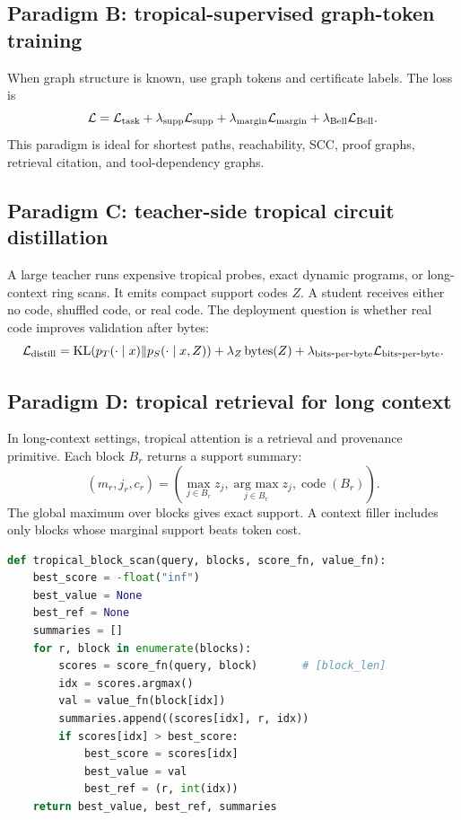 \documentclass[11pt]{article}
\newcommand{\calL}{\mathcal{L}}
\newcommand{\argmax}{\operatorname*{arg\ max}}
\newcommand{\bits}{\operatorname{bits\mbox{-}per\mbox{-}byte}}
\begin{document}
\subsection{Paradigm B: tropical-supervised graph-token training}

When graph structure is known, use graph tokens and certificate labels.  The loss is
\begin{equation}
\calL=\calL_{\rm task}+\lambda_{\rm supp}\calL_{\rm supp}+\lambda_{\rm margin}\calL_{\rm margin}+\lambda_{\rm Bell}\calL_{\rm Bell}.
\end{equation}
This paradigm is ideal for shortest paths, reachability, SCC, proof graphs, retrieval citation, and tool-dependency graphs.

\subsection{Paradigm C: teacher-side tropical circuit distillation}

A large teacher runs expensive tropical probes, exact dynamic programs, or long-context ring scans.  It emits compact support codes \(Z\).  A student receives either no code, shuffled code, or real code.  The deployment question is whether real code improves validation after bytes:
\begin{equation}
\calL_{\rm distill}=\operatorname{KL}(p_T(\cdot\mid x)\Vert p_S(\cdot\mid x,Z))+\lambda_Z\operatorname{bytes}(Z)+\lambda_{\bits}\calL_{\bits}.
\end{equation}

\subsection{Paradigm D: tropical retrieval for long context}

In long-context settings, tropical attention is a retrieval and provenance primitive.  Each block \(B_r\) returns a support summary:
\begin{equation}
(m_r,j_r,c_r)=\left(\max_{j\in B_r} z_j,\argmax_{j\in B_r} z_j,\operatorname{code}(B_r)\right).
\end{equation}
The global maximum over blocks gives exact support.  A context filler includes only blocks whose marginal support beats token cost.

\begin{lstlisting}[language=Python,caption={Blockwise tropical retrieval scan.}]
def tropical_block_scan(query, blocks, score_fn, value_fn):
    best_score = -float("inf")
    best_value = None
    best_ref = None
    summaries = []
    for r, block in enumerate(blocks):
        scores = score_fn(query, block)       # [block_len]
        idx = scores.argmax()
        val = value_fn(block[idx])
        summaries.append((scores[idx], r, idx))
        if scores[idx] > best_score:
            best_score = scores[idx]
            best_value = val
            best_ref = (r, int(idx))
    return best_value, best_ref, summaries
\end{lstlisting}
\end{document}
